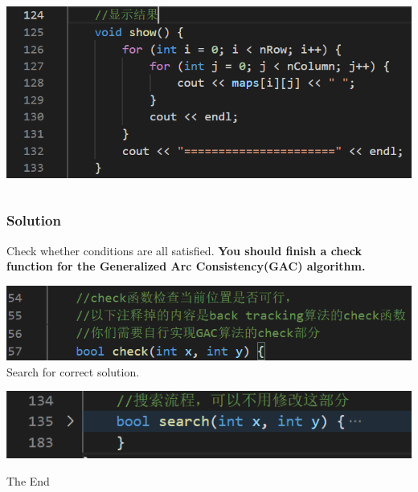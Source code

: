\documentclass{beamer}
\begin{document}
\begin{frame}
\begin{columns}
\begin{column}{.5\linewidth}
      \includegraphics[width=1.05\textwidth]{Pic/print}
    \end{column}
  \end{columns}

\end{frame}

\begin{frame}
  \frametitle{Solution}
      Check whether conditions are all satisfied.
      \textbf{You should finish a check function for the Generalized Arc Consistency(GAC) algorithm.}
      
      
      \includegraphics[width=.9\textwidth]{Pic/check}
      Search for correct solution.
      
      \includegraphics[width=.9\textwidth]{Pic/search}

\end{frame}




\begin{frame}
  \Huge{\centerline{The End}}
\end{frame}

\end{document}
